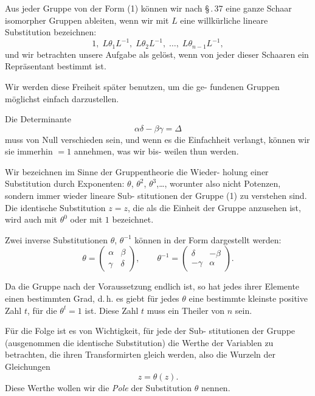 \documentclass[12pt,a4paper]{article}
\theoremstyle{plain}
\theoremstyle{definition}
\theoremstyle{remark}
\begin{document}
Aus jeder Gruppe von der Form (1) k\"onnen wir nach \S\,.\,37
eine ganze Schaar isomorpher Gruppen ableiten, wenn wir mit $L$
eine willk\"urliche lineare Substitution bezeichnen:
\begin{equation}\label{eq:51_4}
1,\; L\theta_1L^{-1},\; L\theta_2L^{-1},\; \ldots,\; L\theta_{n-1}L^{-1},\tag{4}
\end{equation}
und wir betrachten unsere Aufgabe als gel\"ost, wenn von jeder
dieser Schaaren ein Repr\"asentant bestimmt ist.

Wir werden diese Freiheit sp\"ater benutzen, um die ge-
fundenen Gruppen m\"oglichst einfach darzustellen.

Die Determinante
\[
\alpha\delta - \beta\gamma = \Delta
\]
muss von Null verschieden sein, und wenn es die Einfachheit
verlangt, k\"onnen wir sie immerhin $= 1$ annehmen, was wir bis-
weilen thun werden.

Wir bezeichnen im Sinne der Gruppentheorie die Wieder-
holung einer Substitution durch Exponenten: $\theta$, $\theta^2$, $\theta^3$,\ldots,
worunter also nicht Potenzen, sondern immer wieder lineare Sub-
stitutionen der Gruppe (1) zu verstehen sind. Die identische
Substitution $z = z$, die als die Einheit der Gruppe anzusehen
ist, wird auch mit $\theta^0$ oder mit $1$ bezeichnet.

Zwei inverse Substitutionen $\theta$, $\theta^{-1}$ k\"onnen in der Form
dargestellt werden:
\[
\theta = \begin{pmatrix}\alpha & \beta\\ \gamma & \delta\end{pmatrix},\qquad
\theta^{-1} = \begin{pmatrix}\delta & -\beta\\ -\gamma & \alpha\end{pmatrix}.
\]

Da die Gruppe nach der Voraussetzung endlich ist, so hat
jedes ihrer Elemente einen bestimmten Grad, d.\,h. es giebt f\"ur
jedes $\theta$ eine bestimmte kleinste positive Zahl $t$, f\"ur die $\theta^t = 1$
ist. Diese Zahl $t$ muss ein Theiler von $n$ sein.

F\"ur die Folge ist es von Wichtigkeit, f\"ur jede der Sub-
stitutionen der Gruppe (ausgenommen die identische Substitution)
die Werthe der Variablen zu betrachten, die ihren Transformirten
gleich werden, also die Wurzeln der Gleichungen
\begin{equation}\label{eq:51_5}
z = \theta(z).\tag{5}
\end{equation}
Diese Werthe wollen wir die \emph{Pole} der Substitution $\theta$
nennen.
\end{document}
